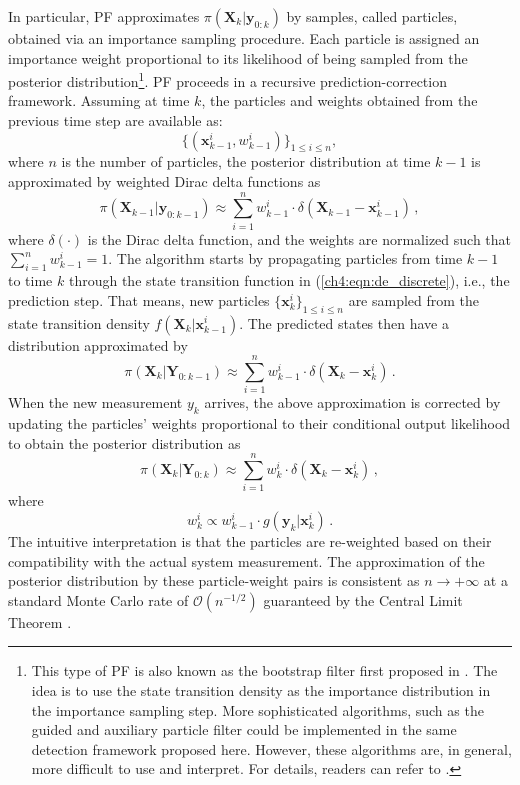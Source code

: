 In particular, PF approximates $\pi(\boldsymbol{X}_k | \boldsymbol{y}_{0:k})$ by samples, called particles, obtained via an importance sampling procedure. Each particle is assigned an importance weight proportional to its likelihood of being sampled from the posterior distribution\footnote{This type of PF is also known as the bootstrap filter first proposed in \cite{Gordon1993}. The idea is to use the state transition density as the importance distribution in the importance sampling step. More sophisticated algorithms, such as the guided and auxiliary particle filter could be implemented in the same detection framework proposed here. However, these algorithms are, in general, more difficult to use and interpret. For details, readers can refer to \cite{doucet2009tutorial}.}. PF proceeds in a recursive prediction-correction framework. Assuming at time $k$, the particles and weights obtained from the previous time step are available as:
$$
\{(\boldsymbol{x}_{k-1}^{i}, w_{k-1}^{i})\}_{1\leq i \leq n},
$$ where $n$ is the number of particles, the posterior distribution at time $k-1$ is approximated by weighted Dirac delta functions as
\begin{equation}
\pi(\boldsymbol{X}_{k-1} | \boldsymbol{y}_{0:k-1}) \approx \sum_{i=1}^{n} w_{k-1}^{i} \cdot \delta(\boldsymbol{X}_{k-1}-\boldsymbol{x}_{k-1}^{i}) \,,
\end{equation} 
where $\delta (\cdot)$ is the Dirac delta function, and the weights are normalized such that $\sum_{i=1}^{n} w_{k-1}^{i} = 1$. The algorithm starts by propagating particles from time $k-1$ to time $k$ through the state transition function in (\ref{ch4:eqn:de_discrete}), i.e., the prediction step. That means, new particles $\{\boldsymbol{x}_k^{i}\}_{1\leq i \leq n}$ are sampled from the state transition density $f(\boldsymbol{X}_k|\boldsymbol{x}_{k-1}^{i})$. The predicted states then have a distribution approximated by 
\begin{equation}
\label{ch4:eqn:prediction}
\pi(\boldsymbol{X}_k | \boldsymbol{Y}_{0: k-1}) \approx \sum_{i=1}^{n} w_{k-1}^{i} \cdot \delta(\boldsymbol{X}_k-\boldsymbol{x}_k^{i}) \,.
\end{equation}
When the new measurement $y_k$ arrives, the above approximation is corrected by updating the particles' weights proportional to their conditional output likelihood to obtain the posterior distribution as 
\begin{equation}
\label{ch4:eqn:particle_approx}
\pi(\boldsymbol{X}_k | \boldsymbol{Y}_{0: k}) \approx \sum_{i=1}^{n} w_k^{i} \cdot \delta(\boldsymbol{X}_k-\boldsymbol{x}_k^{i}) \,,
\end{equation} where 
$$
w_k^{i} \propto  w_{k-1}^{i} \cdot g(\boldsymbol{y}_k | \boldsymbol{x}_k^{i}) \,.
$$
The intuitive interpretation is that the particles are re-weighted based on their compatibility with the actual system measurement. The approximation of the posterior distribution by these particle-weight pairs is consistent as $n \rightarrow +\infty$ at a standard Monte Carlo rate of $\mathcal{O}(n^{-1/2})$ guaranteed by the Central Limit Theorem \cite{doucet2009tutorial}. 

